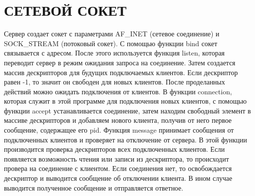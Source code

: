 \section{СЕТЕВОЙ СОКЕТ}

Сервер создает сокет с параметрами {\ttfamily AF\_INET} (сетевое соединение) и {\ttfamily SOCK\_STREAM} (потоковый сокет). С помощью функции {\ttfamily bind} сокет связывается с адресом. После этого используется функция {\ttfamily listen}, которая переводит сервер в режим ожидания запроса на соединение. Затем создается массив дескрипторов для будущих подключаемых клиентов. Если дескриптор равен -1, то значит он свободен для новых клиентов. После проделанных действий можно ожидать подключения от клиентов. В функции {\ttfamily connection}, которая служит в этой программе для подключения новых клиентов, с помощью функции {\ttfamily accept} устанавливается соединение, затем находим свободный элемент в массиве дескрипторов и добавляем нового клиента, получив от него первое сообщение, содержащее его pid. Функция {\ttfamily message} принимает сообщения от подключенных клиентов и проверяет на отключение от сервера. В этой функции производится проверка дескрипторов всех подключенных клиентов. Если появляется возможность чтения или записи из дескриптора, то происходит провера на соединение с клиентом. Если соединения нет, то освобождается дескриптор и выводится сообщение об отключении клиента. В ином случае выводится полученное сообщение и отправляется ответное.

